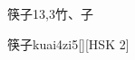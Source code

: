 \begin{entry}{筷子}{13,3}{⽵、⼦}
  \begin{phonetics}{筷子}{kuai4zi5}[][HSK 2]
  \end{phonetics}
\end{entry}
